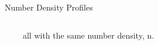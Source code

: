 \documentclass{beamer}
\begin{document}
\begin{frame}{Number Density Profiles}
\begin{columns}[t]
    $~~~~~~~~~~$all with the same number density, n.
	\end{columns}
\end{frame}

\end{document}
